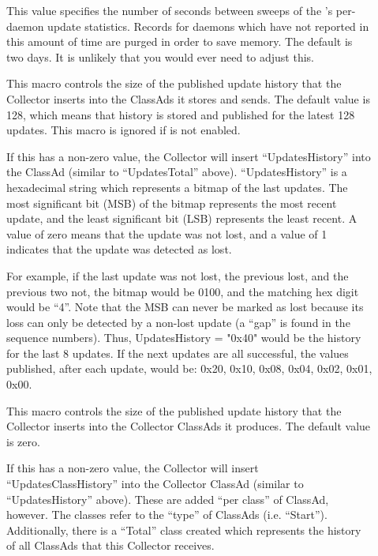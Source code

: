 \begin{description}
\item[]
  \label{param:CollectorStatsSweep} This value specifies the number of
  seconds between sweeps of the 's per-daemon update
  statistics.  Records for daemons which have not reported in this amount
  of time are purged in order to save memory.  The default is two days.
  It is unlikely that you would ever need to adjust this.

\item[]
  \label{param:CollectorDaemonHistorySize} This macro controls the
  size of the published update history that the Collector inserts into
  the ClassAds it stores and sends.  The default value is 128, which
  means that history is stored and published for the latest 128
  updates.  This macro is ignored if 
  is not enabled.

  If this has a non-zero value, the Collector will insert
  ``UpdatesHistory'' into the ClassAd (similar to ``UpdatesTotal''
  above).  ``UpdatesHistory'' is a hexadecimal string which represents
  a bitmap of the last 
  updates.  The most significant bit (MSB) of the bitmap represents the
  most recent update, and the least significant bit (LSB) represents
  the least recent.  A value of zero means that the update was not
  lost, and a value of 1 indicates that the update was detected as
  lost.

  For example, if the last update was not lost, the previous lost, and
  the previous two not, the bitmap would be 0100, and the matching hex
  digit would be ``4''.  Note that the MSB can never be marked as lost
  because its loss can only be detected by a non-lost update (a
  ``gap'' is found in the sequence numbers).  Thus, UpdatesHistory =
  "0x40" would be the history for the last 8 updates.  If the next
  updates are all successful, the values published, after each update,
  would be: 0x20, 0x10, 0x08, 0x04, 0x02, 0x01, 0x00.

\item[]
  \label{param:CollectorClassHistorySize} This macro controls the
  size of the published update history that the Collector inserts into
  the Collector ClassAds it produces.  The default value is zero.

  If this has a non-zero value, the Collector will insert
  ``UpdatesClassHistory'' into the Collector ClassAd (similar to
  ``UpdatesHistory'' above).  These are added ``per class'' of
  ClassAd, however.  The classes refer to the ``type'' of ClassAds
  (i.e. ``Start'').  Additionally, there is a ``Total'' class created
  which represents the history of all ClassAds that this Collector
  receives.


\end{description}
